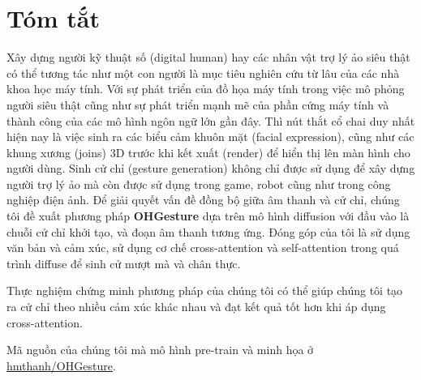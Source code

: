\chapter*{Tóm tắt}
\label{abstract}

Xây dựng người kỹ thuật số (digital human) hay các nhân vật trợ lý ảo siêu thật có thể tương tác như một con người là mục tiêu nghiên cứu từ lâu của các nhà khoa học máy tính. Với sự phát triển của đồ họa máy tính trong việc mô phỏng người siêu thật cũng như sự phát triển mạnh mẽ của phần cứng máy tính và thành công của các mô hình ngôn ngữ lớn gần đây.
Thì nút thắt cổ chai duy nhất hiện nay là việc sinh ra các biểu cảm khuôn mặt (facial expression), cũng như các khung xương (joins) 3D trước khi kết xuất (render) để hiển thị lên màn hình cho người dùng.
Sinh cử chỉ (gesture generation) không chỉ được sử dụng để xây dựng người trợ lý ảo mà còn được sử dụng trong game, robot cũng như trong công nghiệp điện ảnh.
Để giải quyết vấn đề đồng bộ giữa âm thanh và cử chỉ, chúng tôi đề xuất phương pháp \textbf{OHGesture} dựa trên mô hình diffusion với đầu vào là chuỗi cử chỉ khởi tạo, và đoạn âm thanh tương ứng.
Đóng góp của tôi là sử dụng văn bản và cảm xúc, sử dụng cơ chế cross-attention và self-attention trong quá trình diffuse để sinh cử mượt mà và chân thực.

Thực nghiệm chứng minh phương pháp của chúng tôi có thể giúp chúng tôi tạo ra cử chỉ theo nhiều cảm xúc khác nhau và đạt kết quả tốt hơn khi áp dụng cross-attention.




Mã nguồn của chúng tôi mà mô hình pre-train và minh họa ở \href{https://github.com/hmthanh/OHGesture}{hmthanh/OHGesture}.